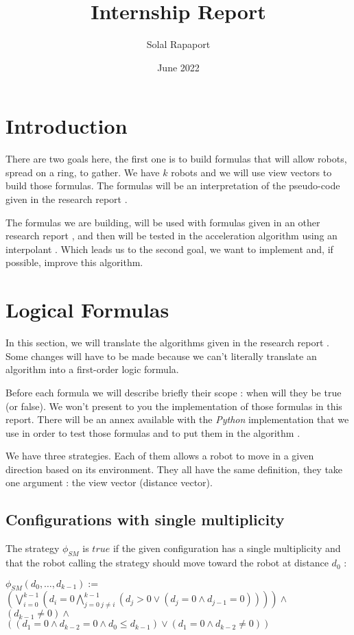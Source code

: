 \documentclass{article}
\title{Internship Report}
\author{Solal Rapaport }
\date{June 2022}
\begin{document}
\maketitle

\section{Introduction}

There are two goals here, the first one is to build formulas that will allow robots, spread on a ring, to gather. We have $k$ robots and we will use view vectors to build those formulas. The formulas will be an interpretation of the pseudo-code given in the research report \cite{gathering}.

The formulas we are building, will be used with formulas given in an other research report \cite{algo}, and then will be tested in the acceleration algorithm using an interpolant \cite{algo}. Which leads us to the second goal, we want to implement and, if possible, improve this algorithm.

\section{Logical Formulas}

In this section, we will translate the algorithms given in the research report \cite{gathering}. Some changes will have to be made because we can't literally translate an algorithm into a first-order logic formula.

Before each formula we will describe briefly their scope : when will they be true (or false). We won't present to you the implementation of those formulas in this report. There will be an annex available with the \textit{Python} implementation that we use in order to test those formulas and to put them in the algorithm \cite{algo}.

We have three strategies. Each of them allows a robot to move in a given direction based on its environment. They all have the same definition, they take one argument : the view vector (distance vector).

\subsection{Configurations with single multiplicity}

The strategy $\phi_{SM}$ is $true$ if the given configuration has a single multiplicity and that the robot calling the strategy should move toward the robot at distance $d_{0}$ :
\begin{center}
$\phi_{SM}(d_0, \ldots , d_{k-1}):=$\\
$(\bigvee_{i=0}^{k-1}(d_i = 0\bigwedge_{j=0\ j\not=i}^{k-1} (d_j > 0 \lor (d_j = 0 \land d_{j-1} = 0) ) ))\land$\\
$(d_{k-1} \not= 0) \land $\\
$((d_1 = 0 \land d_{k-2} = 0 \land d_0 \leq d_{k-1}) \lor (d_1 = 0 \land d_{k-2} \not= 0))$
\end{center}
\end{document}
